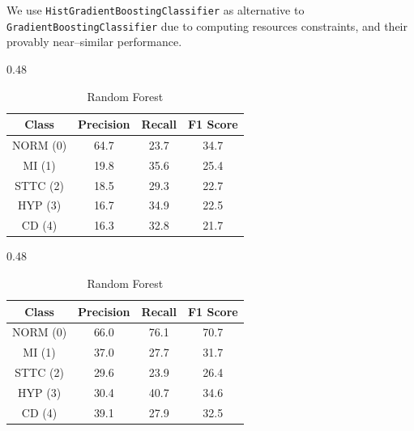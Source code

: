 We use \texttt{HistGradientBoostingClassifier} as alternative to \texttt{GradientBoostingClassifier} due to computing resources constraints, and their provably near–similar performance.

\begin{table}[H]
    \centering
    \caption{\textbf{Protocol B} class–wise performance metrics across models.}
    \label{tab:cv_classwise}

    \begin{subtable}[t]{0.48\textwidth}
        \centering
        \caption{KNN}
        \label{tab:cv_knn}
        \begin{tabular}{cccc}
            \toprule
            Class & Precision & Recall & F1 Score \\
            \midrule
            NORM (0) & 64.7	& 23.7 & 34.7 \\
            MI   (1) & 19.8 & 35.6 & 25.4 \\
            STTC (2) & 18.5	& 29.3 &	22.7 \\
            HYP  (3) & 16.7 & 34.9 &	22.5 \\
            CD   (4) & 16.3	& 32.8 & 21.7 \\
            \bottomrule
        \end{tabular}
    \end{subtable}
    \hfill
    \begin{subtable}[t]{0.48\textwidth}
        \centering
        \caption{Random Forest}
        \label{tab:cv_rf}
        \begin{tabular}{cccc}
            \toprule
            Class & Precision & Recall & F1 Score \\
            \midrule
            NORM (0) & 66.0 & 76.1 & 70.7 \\
            MI   (1) & 37.0 & 27.7 & 31.7 \\
            STTC (2) & 29.6 & 23.9 & 26.4 \\
            HYP  (3) & 30.4 & 40.7 & 34.6 \\
            CD   (4) & 39.1 & 27.9 & 32.5 \\
            \bottomrule
        \end{tabular}
    \end{subtable}

    \bigskip


\end{table}
